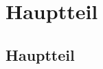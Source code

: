 
\chapter{Hauptteil}  %
\label{cha:} %
\section{Hauptteil} %
\label{sec:} %


\subsection{} %
\label{sse:}
\subsubsection{} %
\label{sss:}

